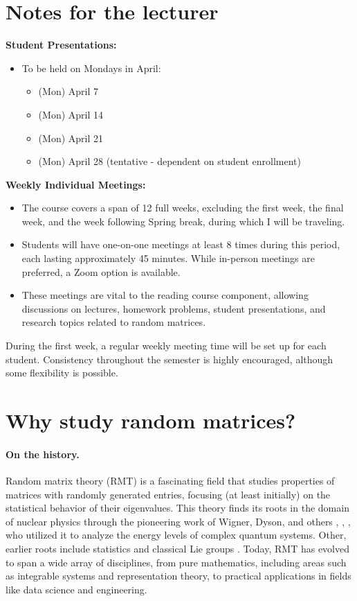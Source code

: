 \documentclass[letterpaper,11pt,oneside,reqno]{article}
\numberwithin{equation}{section}
\theoremstyle{definition}
\newenvironment{lnotes}{\section*{Notes for the lecturer}}{}
\begin{document}
\begin{lnotes}
\textbf{Student Presentations:}
\begin{itemize}
				\item To be held on Mondays in April:
				\begin{itemize}
								\item (Mon) April 7
								\item (Mon) April 14
								\item (Mon) April 21
								\item (Mon) April 28 (tentative - dependent on student enrollment)
				\end{itemize}
\end{itemize}

\textbf{Weekly Individual Meetings:}
\begin{itemize}
				\item The course covers a span of 12 full weeks, excluding the first week, the final week, and the week following Spring break, during which I will be traveling.
				\item Students will have one-on-one meetings at least 8 times during this period, each lasting approximately 45 minutes. While in-person meetings are preferred, a Zoom option is available.
				\item These meetings are vital to the reading course component, allowing discussions on lectures, homework problems, student presentations, and research topics related to random matrices.
\end{itemize}
During the first week, a regular weekly meeting time will be set up for each student. Consistency throughout the semester is highly encouraged, although some flexibility is possible.





\end{lnotes}


\section{Why study random matrices?}

\paragraph{On the history.}
Random matrix theory (RMT) is a fascinating field that
studies
properties of matrices with randomly generated entries,
focusing (at least initially)
on the statistical behavior of their eigenvalues.
This theory finds its roots in the domain of nuclear
physics through the pioneering work of Wigner, Dyson, and
others \cite{wigner1955characteristic},
\cite{dyson1962brownian},
\cite{Dyson1962_III}, who utilized it to analyze the energy levels of complex quantum systems.
Other, earlier roots include statistics \cite{dixon1905generalization}
and classical Lie groups \cite{Hurwitz1897}.
Today, RMT has evolved to span a wide array of disciplines,
from pure mathematics, including areas such as integrable
systems and representation theory, to practical applications
in fields like data science and engineering.
\end{document}
